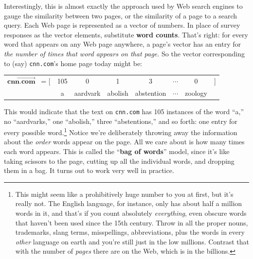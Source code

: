 \begin{alttitles}

Interestingly, this is almost exactly the approach used by Web search engines
to gauge the similarity between two pages, or the similarity of a page to a
search query. Each Web page is represented as a vector of numbers. In place of
survey responses as the vector elements, substitute \textbf{word counts}.
That's right: for every word that appears on any Web page anywhere, a page's
vector has an entry for \textit{the number of times that word appears on that
page.} So the vector corresponding to (say) \texttt{cnn.com}'s home page today
might be:

\vspace{-.15in}
\begin{center}
\begin{tabular}{cccccccc}
$\overrightarrow{\textbf{cnn.com}}$ \ = [ & 105 & 0 & 1 & 3 & $\cdots$ & 0 & ] \\
& \scriptsize{a} & \scriptsize{aardvark} & \scriptsize{abolish} &
\scriptsize{abstention} & $\cdots$ & \scriptsize{zoology} & \medskip \\
\end{tabular}
\end{center}
\vspace{-.15in}


This would indicate that the text on \texttt{cnn.com} has 105 instances of the
word ``a,'' no ``aardvarks,'' one ``abolish,'' three ``abstentions,'' and so
forth: one entry for every possible word.\footnote{This might seem like a
prohibitively huge number to you at first, but it's really not. The English
language, for instance, only has about half a million words in it, and that's
if you count absolutely \textit{everything}, even obscure words that haven't
been used since the 15th century. Throw in all the proper nouns, trademarks,
slang terms, misspellings, abbreviations, plus the words in every
\textit{other} language on earth and you're still just in the low millions.
Contrast that with the number of \textit{pages} there are on the Web, which is
in the billions.} Notice we're deliberately throwing away the information about
the \textit{order} words appear on the page. All we care about is how many
times each word appears. This is called the ``\textbf{bag of words}'' model,
since it's like taking scissors to the page, cutting up all the individual
words, and dropping them in a bag. It turns out to work very well in practice.


\end{alttitles}
